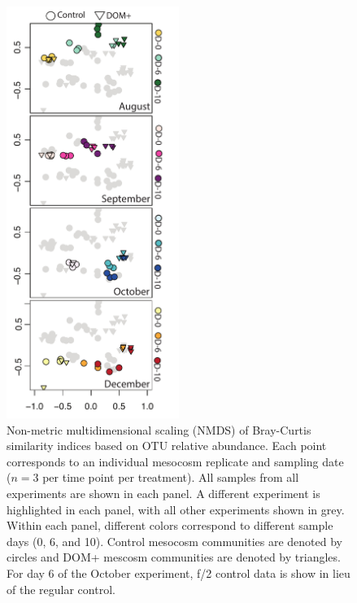 \begin{figure}[htbp] 
\centering 
\includegraphics[width=0.5\textwidth]{Chapter_4_DOM/Figures/Figure_3_nmds}
\caption[Non-metric multidimensional scaling (NMDS) of Bray-Curtis similarity indices based on OTU relative abundance.]{Non-metric multidimensional scaling (NMDS) of Bray-Curtis similarity indices based on OTU relative abundance. Each point corresponds to an individual mesocosm replicate and sampling date ($n=3$ per time point per treatment). All samples from all experiments are shown in each panel. A different experiment is highlighted in each panel, with all other experiments shown in grey. Within each panel, different colors correspond to different sample days (0, 6, and 10). Control mesocosm communities are denoted by circles and DOM+ mescosm communities are denoted by triangles. For day 6 of the October experiment, f/2 control data is show in lieu of the regular control.} 
\label{fig:ch3:nmds} 
\end{figure}

